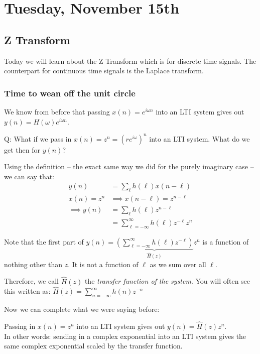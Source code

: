 \section{Tuesday, November 15th}
\subsection{Z Transform}
Today we will learn about the Z Transform which is for discrete time signals. The counterpart for continuous time signals is the Laplace transform.

\subsubsection{Time to wean off the unit circle}
We know from before that passing $x(n)=e^{i\omega n}$ into an LTI system gives out $y(n)=H(\omega)e^{i\omega n}$.

\begin{shaded}
Q: What if we pass in $x(n)=z^n=(re^{i\omega})^n$ into an LTI system. What do we get then for $y(n)$?
\end{shaded}

Using the definition -- the exact same way we did for the purely imaginary case -- we can say that:
\begin{align*}
    y(n) 
    &=
    \sum_{\ell} h(\ell)x(n-\ell)
    \\
    x(n) = z^n
    &\implies
    x(n-\ell) = z^{n-\ell}
    \\
    \implies
    y(n) 
    &=
    \sum_{\ell} h(\ell) z^{n-\ell}
    \\
    &=
    \sum_{\ell=-\infty}^\infty h(\ell) z^{-\ell} z^n
\end{align*}

Note that the first part of $y(n)=\underbrace{\left(\sum_{\ell=-\infty}^\infty h(\ell) z^{-\ell}\right)}_{\hat H(z)} z^n$ is a function of nothing other than $z$. It is not a function of $\ell$ as we sum over all $\ell$. 

Therefore, we call $\hat H(z)$ the \textit{transfer function of the system}. You will often see this written as: $\displaystyle\hat H(z)= \sum_{n=-\infty}^\infty h(n)z^{-n}$

\hrulefill

Now we can complete what we were saying before:

Passing in $x(n)=z^n$ into an LTI system gives out $y(n)=\hat H(z)z^n$.\\
In other words: sending in a complex exponential into an LTI system gives the same complex exponential scaled by the transfer function.

